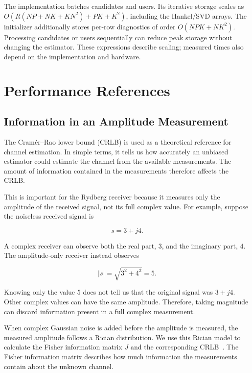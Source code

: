 \documentclass[journal]{IEEEtran}
\begin{document}
The implementation batches candidates and users. Its iterative storage
scales as $O(R(NP+NK+KN^2)+PK+K^2)$, including the Hankel/SVD arrays.
The initializer additionally stores per-row diagnostics of order
$O(NPK+NK^2)$. Processing candidates or users sequentially can reduce
peak storage without changing the estimator. These expressions describe
scaling; measured times also depend on the implementation and hardware.

\section{Performance References}
\label{sec:crlb}

\subsection{Information in an Amplitude Measurement}

The Cramér--Rao lower bound (CRLB) is used as a theoretical reference for
channel estimation. In simple terms, it tells us how accurately an
unbiased estimator could estimate the channel from the available
measurements. The amount of information contained in the measurements
therefore affects the CRLB.

This is important for the Rydberg receiver because it measures only the
amplitude of the received signal, not its full complex value. For example,
suppose the noiseless received signal is

\begin{equation}
s=3+j4.
\end{equation}

A complex receiver can observe both the real part, $3$, and
the imaginary part, $4$. The amplitude-only receiver instead observes

\begin{equation}
|s|
=
\sqrt{3^2+4^2}
=
5.
\end{equation}

Knowing only the value $5$ does not tell us that the original signal was
$3+j4$. Other complex values can have the same amplitude. Therefore, taking magnitude can discard information present in a full
complex measurement.

When complex Gaussian noise is added before the amplitude is measured, the
measured amplitude follows a Rician distribution. We use this Rician model
to calculate the Fisher information matrix $J$ and the corresponding
CRLB~\cite{balan2015,cui2025}. The Fisher information matrix describes how
much information the measurements contain about the unknown channel.
\end{document}
